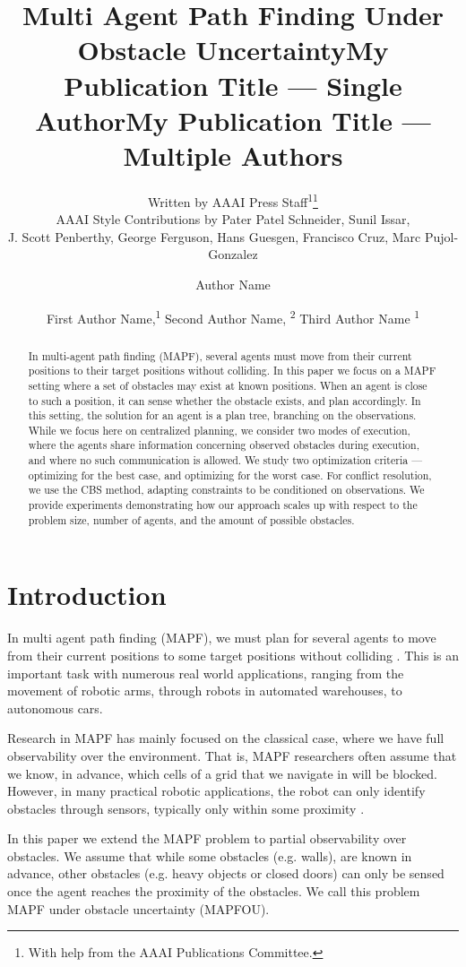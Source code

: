 \documentclass[letterpaper]{article} %
\title{Multi Agent Path Finding Under Obstacle Uncertainty}
\author{
    Written by AAAI Press Staff\textsuperscript{\rm 1}\thanks{With help from the AAAI Publications Committee.}\\
    AAAI Style Contributions by Pater Patel Schneider,
    Sunil Issar,\\
    J. Scott Penberthy,
    George Ferguson,
    Hans Guesgen,
    Francisco Cruz\equalcontrib,
    Marc Pujol-Gonzalez\equalcontrib
}
\title{My Publication Title --- Single Author}
\author {
    Author Name
}
\title{My Publication Title --- Multiple Authors}
\author {
    First Author Name,\textsuperscript{\rm 1}
    Second Author Name, \textsuperscript{\rm 2}
    Third Author Name \textsuperscript{\rm 1}
}
\begin{document}
\maketitle

\begin{abstract}
In multi-agent path finding (MAPF), several agents must move from their current positions to their target positions without colliding. In this paper we focus on a MAPF setting where a set of obstacles may exist at known positions. When an agent is close to such a position, it can sense whether the obstacle exists, and plan accordingly. In this setting, the solution for an agent is a plan tree, branching on the observations.
While we focus here on centralized planning, we consider two modes of execution, where the agents share information concerning observed obstacles during execution, and where no such communication is allowed.
We study two optimization criteria --- optimizing for the best case, and optimizing for the worst case.
For conflict resolution, we use the CBS method, adapting constraints to be conditioned on observations.
We provide experiments demonstrating how our approach scales up with respect to the problem size, number of agents, and the amount of possible obstacles.

\end{abstract}




\section{Introduction}

In multi agent path finding (MAPF), we must plan for several agents to move from their current positions to some target positions without colliding \cite{stern2019multi}. This is an important task with numerous real world applications, ranging from the movement of robotic arms, through robots in automated warehouses, to autonomous cars.

Research in MAPF has mainly focused on the classical case, where we have full observability over the environment. That is, MAPF researchers often assume that we know, in advance, which cells of a grid that we navigate in will be blocked. However, in many practical robotic applications, the robot can only identify obstacles through sensors, typically only within some proximity \cite{lenser2003visual}.

In this paper we extend the MAPF problem to partial observability over obstacles. We assume that while some obstacles (e.g. walls), are known in advance, other obstacles (e.g. heavy objects or closed doors) can only be sensed once the agent reaches the proximity of the obstacles. We call this problem MAPF under obstacle uncertainty (MAPFOU).
\end{document}
